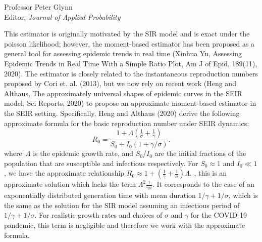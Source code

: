 \documentclass[11pt]{letter} %
\begin{document}
\begin{letter}{Professor
	Peter Glynn\\
	Editor, {\em Journal of Applied Probability}}
\begin{enumerate}
\begin{enumerate}
	This estimator is originally motivated by the SIR model and is exact under the poisson likelihood; however, the moment-based estimator has been proposed as a general tool for assessing epidemic trends in real time (Xinhua Yu, Assessing Epidemic Trends in Real Time With a Simple Ratio Plot, Am J of Epid, 189(11), 2020).  The estimator is closely related to the instantaneous reproduction numbers proposed by Cori et. al. (2013), but we now rely on recent work (Heng and Althaus, The approximately universal shapes of epidemic curves in the SEIR model, Sci Reports, 2020) to propose an approximate moment-based estimator in the SEIR setting. Specifically, Heng and Althaus (2020) derive the following approximate formula for the basic reproduction number under SEIR dynamics:
	$$
	R_0 = \frac{1 + \Lambda \left(\frac{1}{\sigma} + \frac{1}{\gamma} \right)}{S_0 + I_0 (1 + \gamma/\sigma)}.
	$$
	where~$\Lambda$ is the epidemic growth rate, and $S_0$/$I_0$ are the initial fractions of the population that are susceptible and infectious respectively.  For $S_0 \approx 1$ and $I_0 \ll 1$, we have the approximate relationship $R_0 \approx 1 + (\frac{1}{\gamma} + \frac{1}{\sigma})\Lambda$.
	, this is an approximate solution which lacks the term $\Lambda^2 \frac{1}{\gamma \sigma}$.  It corresponds to the case of an exponentially distributed generation time with mean duration $1/\gamma + 1/\sigma$, which is the same as the solution for the SIR model assuming an infectious period of $1/\gamma + 1/\sigma$. For realistic growth rates and choices of $\sigma$ and $\gamma$ for the COVID-19 pandemic, this term is negligible and therefore we work with the approximate formula.
	\vspace{5mm}


\end{enumerate}
\end{enumerate}
\end{letter}
\end{document}
